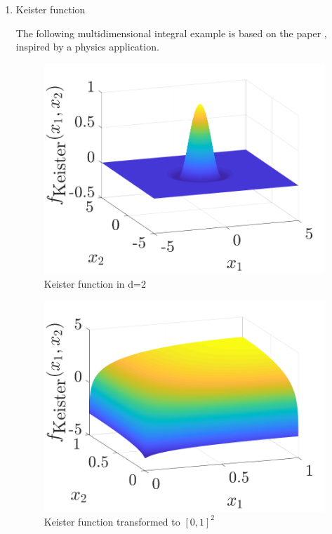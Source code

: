 \documentclass[twocolumn]{svjour3}          %
\begin{document}
\begin{enumerate}
\item Keister function

The following multidimensional integral example is based on the paper \cite{KeisterExample}, inspired by a physics application.
\begin{figure}
	\centering
	\includegraphics[width=0.95\linewidth]{"figures/Keister_wholeR"}
	\caption[Guaranteed:]{Keister function in d=2}
	\label{fig:keister-R}
\end{figure}

\begin{figure}
	\centering
	\includegraphics[width=0.95\linewidth]{"figures/Keister_cube_0_1"}
	\caption[Guaranteed:]{Keister function transformed to $[0,1]^2$}
	\label{fig:keister-0_1}
\end{figure}



\end{enumerate}
\end{document}
